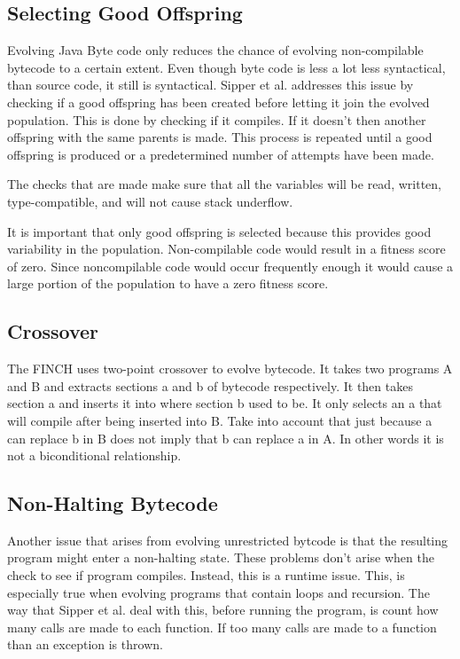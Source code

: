 \documentclass{sig-alternate}
\begin{document}
\subsection{Selecting Good Offspring}
Evolving Java Byte code only reduces the chance of evolving non-compilable bytecode to a certain extent. Even though byte code is less a lot less syntactical, than source code, it still is syntactical. Sipper et al.\cite{FINCH2:2009} addresses this issue by checking if a good offspring has been created before letting it join the evolved population. This is done by checking if it compiles. If it doesn't then another offspring with the same parents is made. This process is repeated until a good offspring is produced or a predetermined number of attempts have been made.\par
The checks that are made make sure that all the variables will be read, written, type-compatible, and will not cause stack underflow\cite{VIII:2011}.\par
It is important that only good offspring is selected because this provides good variability in the population. Non-compilable code would result in a fitness score of zero. Since noncompilable code would occur frequently enough it would cause a large portion of the population to have a zero fitness score.

\subsection{Crossover}


The FINCH uses two-point crossover to evolve bytecode. It takes two programs A and B and extracts sections a and b of bytecode respectively. It then takes section a and inserts it into where section b used to be. It only selects an a that will compile after being inserted into B. Take into account that just because a can replace b in B does not imply that b can replace a in A. In other words it is not a biconditional relationship.

\subsection{Non-Halting Bytecode}
Another issue that arises from evolving unrestricted bytcode is that the resulting program might enter a non-halting state. These problems don't arise when the check to see if program compiles. Instead, this is a runtime issue. This, is especially true when evolving programs that contain loops and recursion.
The way that Sipper et al.\cite{FINCH:2011} deal with this, before running the program, is count how many calls are made to each function. If too many calls are made to a function than an exception is thrown.
\end{document}
